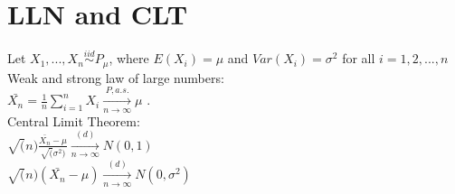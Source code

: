 \section{LLN and CLT}
Let $X_1, ..., X_n \stackrel{iid}{\sim} P_{\mu}$, where $E(X_i)=\mu$ and $Var(X_i)=\sigma^2$ for all $i=1,2,...,n$\\

Weak and strong law of large numbers:\\

$\bar{X_n}= \frac{1}{n} \sum_{i=1}^{n} X_i \xrightarrow[n \rightarrow \infty]{P, a.s.} \mu$ .\\

Central Limit Theorem:\\

$\sqrt(n)\frac{\bar{X_n}-\mu}{\sqrt(\sigma^2)} \xrightarrow[n \rightarrow \infty]{(d)} N(0,1)$\\

$\sqrt(n)(\bar{X_n}-\mu) \xrightarrow[n \rightarrow \infty]{(d)} N(0,\sigma^2)$\\

